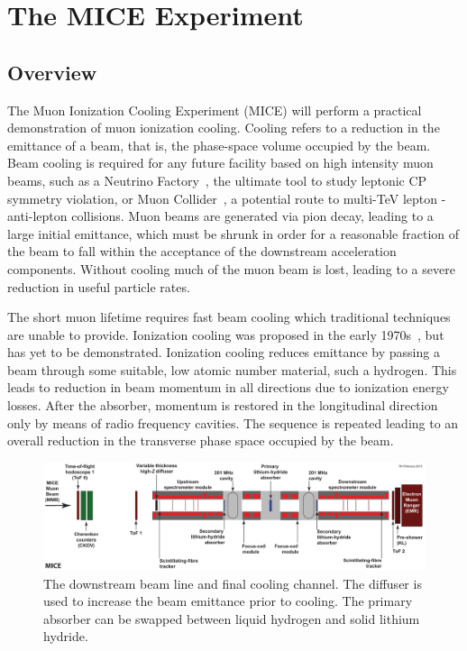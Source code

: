 \section{The MICE Experiment}
\label{sec:MICE}
  \subsection{Overview}
  \label{subsec:Overview}
  The Muon Ionization Cooling Experiment (MICE) will perform a practical demonstration of muon ionization cooling. Cooling refers to a reduction in the emittance of a beam, that is, the phase-space volume occupied by the beam. Beam cooling is required for any future facility based on high intensity muon beams, such as a Neutrino Factory~\cite{ISS-Physics}, the ultimate tool to study leptonic CP symmetry violation, or Muon Collider~\cite{MC_Overview}, a potential route to multi-TeV lepton - anti-lepton collisions. Muon beams are generated via pion decay, leading to a large initial emittance, which must be shrunk in order for a reasonable fraction of the beam to fall within the acceptance of the downstream acceleration components. Without cooling much of the muon beam is lost, leading to a severe reduction in useful particle rates.   

  The short muon lifetime requires fast beam cooling which traditional techniques are unable to provide.  Ionization cooling was proposed in the early 1970s~\cite{Skrinsky, Neuffer}, but has yet to be demonstrated.  Ionization cooling reduces emittance by passing a beam through some suitable, low atomic number material, such a hydrogen.  This leads to reduction in beam momentum in all directions due to ionization energy losses.  After the absorber, momentum is restored in the longitudinal direction only by means of radio frequency cavities.  The sequence is repeated leading to an overall reduction in the transverse phase space occupied by the beam.

  \begin{figure}[bht]
    \begin{center}
      \includegraphics[width=1.0\linewidth]{01-MICE/Cooling-demo-labels.pdf}
      \caption{\label{fig:CoolingChannel} The downstream beam line and final cooling channel. The diffuser is used to increase the beam emittance prior to cooling. The primary absorber can be swapped between liquid hydrogen and solid lithium hydride.}
    \end{center}
  \end{figure}

